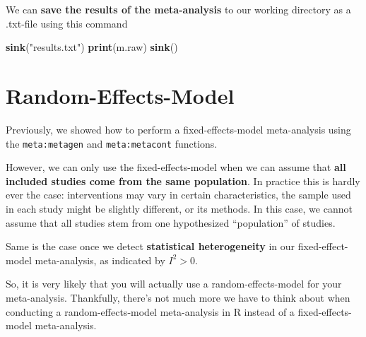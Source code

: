 \documentclass[]{book}
\newenvironment{Shaded}{\begin{snugshade}}{\end{snugshade}}
\newcommand{\KeywordTok}[1]{\textcolor[rgb]{0.13,0.29,0.53}{\textbf{#1}}}
\newcommand{\StringTok}[1]{\textcolor[rgb]{0.31,0.60,0.02}{#1}}
\newcommand{\NormalTok}[1]{#1}
\theoremstyle{definition}
\theoremstyle{definition}
\theoremstyle{definition}
\theoremstyle{remark}
\begin{document}
We can \textbf{save the results of the meta-analysis} to our working
directory as a .txt-file using this command

\begin{Shaded}
\begin{Highlighting}[]
\KeywordTok{sink}\NormalTok{(}\StringTok{"results.txt"}\NormalTok{)}
\KeywordTok{print}\NormalTok{(m.raw)}
\KeywordTok{sink}\NormalTok{()}
\end{Highlighting}
\end{Shaded}

\hypertarget{random}{\section{Random-Effects-Model}\label{random}}

Previously, we showed how to perform a fixed-effects-model meta-analysis
using the \texttt{meta:metagen} and \texttt{meta:metacont} functions.

However, we can only use the fixed-effects-model when we can assume that
\textbf{all included studies come from the same population}. In practice
this is hardly ever the case: interventions may vary in certain
characteristics, the sample used in each study might be slightly
different, or its methods. In this case, we cannot assume that all
studies stem from one hypothesized ``population'' of studies.

Same is the case once we detect \textbf{statistical heterogeneity} in
our fixed-effect-model meta-analysis, as indicated by \(I^{2}>0\).

So, it is very likely that you will actually use a random-effects-model
for your meta-analysis. Thankfully, there's not much more we have to
think about when conducting a random-effects-model meta-analysis in R
instead of a fixed-effects-model meta-analysis.
\end{document}
